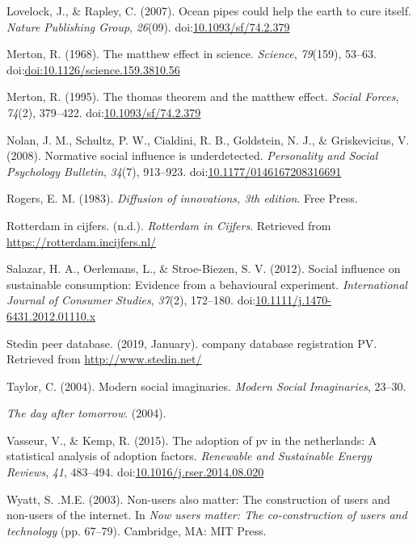\documentclass[man,floatsintext]{apa6}
\begin{document}
\hypertarget{ref-Buisding}{}
Lovelock, J., \& Rapley, C. (2007). Ocean pipes could help the earth to
cure itself. \emph{Nature Publishing Group}, \emph{26}(09).
doi:\href{https://doi.org/10.1093/sf/74.2.379}{10.1093/sf/74.2.379}

\hypertarget{ref-merton_1968}{}
Merton, R. (1968). The matthew effect in science. \emph{Science},
\emph{79}(159), 53--63.
doi:\href{https://doi.org/doi:10.1126/science.159.3810.56}{doi:10.1126/science.159.3810.56}

\hypertarget{ref-merton_1995}{}
Merton, R. (1995). The thomas theorem and the matthew effect.
\emph{Social Forces}, \emph{74}(2), 379--422.
doi:\href{https://doi.org/10.1093/sf/74.2.379}{10.1093/sf/74.2.379}

\hypertarget{ref-schultz_2008}{}
Nolan, J. M., Schultz, P. W., Cialdini, R. B., Goldstein, N. J., \&
Griskevicius, V. (2008). Normative social influence is underdetected.
\emph{Personality and Social Psychology Bulletin}, \emph{34}(7),
913--923.
doi:\href{https://doi.org/10.1177/0146167208316691}{10.1177/0146167208316691}

\hypertarget{ref-rogers_1983}{}
Rogers, E. M. (1983). \emph{Diffusion of innovations, 3th edition}. Free
Press.

\hypertarget{ref-rotterdam_in_cijfers}{}
Rotterdam in cijfers. (n.d.). \emph{Rotterdam in Cijfers}. Retrieved
from \url{https://rotterdam.incijfers.nl/}

\hypertarget{ref-salazar_2012}{}
Salazar, H. A., Oerlemans, L., \& Stroe-Biezen, S. V. (2012). Social
influence on sustainable consumption: Evidence from a behavioural
experiment. \emph{International Journal of Consumer Studies},
\emph{37}(2), 172--180.
doi:\href{https://doi.org/10.1111/j.1470-6431.2012.01110.x}{10.1111/j.1470-6431.2012.01110.x}

\hypertarget{ref-stedin}{}
Stedin peer database. (2019, January). company database registration PV.
Retrieved from \url{http://www.stedin.net/}

\hypertarget{ref-taylor_2004}{}
Taylor, C. (2004). Modern social imaginaries. \emph{Modern Social
Imaginaries}, 23--30.

\hypertarget{ref-DAT}{}
\emph{The day after tomorrow}. (2004).

\hypertarget{ref-vasseur_kemp_2015}{}
Vasseur, V., \& Kemp, R. (2015). The adoption of pv in the netherlands:
A statistical analysis of adoption factors. \emph{Renewable and
Sustainable Energy Reviews}, \emph{41}, 483--494.
doi:\href{https://doi.org/10.1016/j.rser.2014.08.020}{10.1016/j.rser.2014.08.020}

\hypertarget{ref-Wyatt_2003}{}
Wyatt, S. .M.E. (2003). Non-users also matter: The construction of users
and non-users of the internet. In \emph{Now users matter: The
co-construction of users and technology} (pp. 67--79). Cambridge, MA:
MIT Press.

\endgroup

\clearpage

\renewcommand{\listfigurename}{Figure captions}

\listoffigures

\clearpage

\renewcommand{\listtablename}{Table captions}

\listoftables
\end{document}
